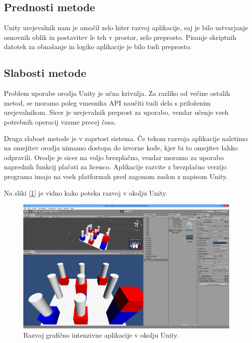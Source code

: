 \subsection{Prednosti metode}

Unity urejevalnik nam je omočil zelo hiter razvoj aplikacije, saj je bilo ustvarjanje osnovnih oblik in postavitev le teh v prostor, zelo preprosto. Pisanje skriptnih datotek za obnašanje in logiko aplikacije je bilo tudi preprosto.

\subsection{Slabosti metode}

Problem uporabe orodja Unity je učna krivulja. Za razliko od večine ostalih metod, se moramo poleg vmesnika API naučiti tudi dela s priloženim urejevalnikom. Sicer je urejevalnik preprost za uporabo, vendar učenje vseh potrebnih operacij vzame precej časa.

Druga slabost metode je v zaprtost sistema. Če tekom razvoja aplikacije naletimo na omejitev orodja nimamo dostopa do izvorne kode, kjer bi to omejitev lahko odpravili. Orodje je sicer na voljo brezplačno, vendar moramo za uporabo naprednih funkcij plačati za licenco. Aplikacije razvite z brezplačno verzijo programa imajo na vseh platformah pred zagonom zaslon z napisom Unity. 

Na sliki [\ref{mineditor}] je vidno kako poteka razvoj v okolju Unity.

\begin{figure}
\begin{center}
\includegraphics[width=12cm]{pic/min-editor.png}
\end{center}
\caption{Razvoj grafično intenzivne aplikacije v okolju Unity.}
\label{mineditor}
\end{figure} 

